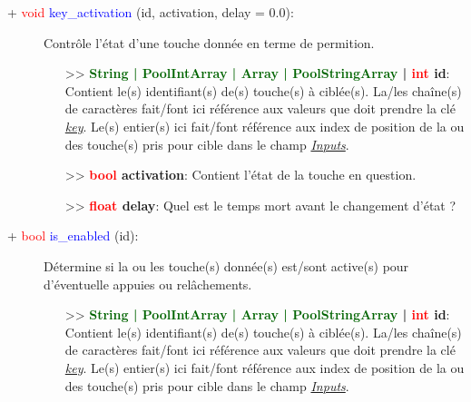 \documentclass[a4paper, 11pt]{article}
\begin{document}
	\begin{description}
		\item [+ \textcolor{red}{void} \textcolor{blue}{key\_activation} (id, activation, delay = 0.0):] 
		Contrôle l'état d'une touche donnée en terme de permition.
		\begin{itemize}
			\item [>> \textbf{\textcolor{darkgreen}{String | PoolIntArray | Array | PoolStringArray} |
			\textcolor{red}{int} id}:] Contient le(s) identifiant(s) de(s) touche(s) à ciblée(s). La/les 
			chaîne(s) de caractères fait/font ici référence aux valeurs que doit prendre la clé 
			\textit{\hyperlink{key}{key}}. Le(s) entier(s) ici fait/font référence aux index de position de 
			la ou des touche(s) pris pour cible dans le champ \textit{\hyperlink{input}{Inputs}}.
			\item [>> \textbf{\textcolor{red}{bool} activation}:] Contient l'état de la touche en question.
			\item [>> \textbf{\textcolor{red}{float} delay}:] Quel est le temps mort avant le changement 
			d'état ?\\
		\end{itemize}
	\end{description}
	\begin{description}
		\item [+ \textcolor{red}{bool} \textcolor{blue}{is\_enabled} (id):] Détermine si la ou les touche(s) 
		donnée(s) est/sont active(s) pour \\d'éventuelle appuies ou relâchements.
		\begin{itemize}
			\item [>> \textbf{\textcolor{darkgreen}{String | PoolIntArray | Array | PoolStringArray} |
			\textcolor{red}{int} id}:] Contient le(s) identifiant(s) de(s) touche(s) à ciblée(s). La/les 
			chaîne(s) de caractères fait/font ici référence aux valeurs que doit prendre la clé 
			\textit{\hyperlink{key}{key}}. Le(s) entier(s) ici fait/font référence aux index de position de 
			la ou des touche(s) pris pour cible dans le champ \textit{\hyperlink{inputs}{Inputs}}.\\
		\end{itemize}
	\end{description}
\end{document}
